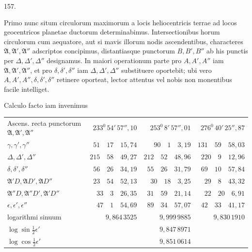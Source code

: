 \par{}\medskip
{}\hypertarget{native-213-article157}{}
\begin{center}157.\end{center}
Primo nunc situm circulorum maximorum a locis heliocentricis terrae ad locos geocentricos planetae ductorum determinabimus. Intersectionibus horum circulorum cum aequatore, aut si mavis illorum nodis ascendentibus, characteres $\mathfrak A,\mathfrak A',\mathfrak A''$ adscriptos concipimus, distantiasque punctorum $B,B',B''$ ab his punctis per $\Delta,\Delta',\Delta''$ designamus. In maiori operationum parte pro $A,A',A''$ iam $\mathfrak A,\mathfrak A',\mathfrak A''$, et pro $\delta,\delta',\delta''$ iam $\Delta,\Delta',\Delta''$ substituere oportebit; ubi vero $A,A',A'',\delta,\delta',\delta''$ retinere oporteat, lector attentus vel nobis non monentibus facile intelliget.

Calculo facto iam invenimus
\begin{center}
\begingroup\footnotesize\setlength{\tabcolsep}{3pt}\renewcommand{\arraystretch}{1.25}
\begin{tabular}{l|r|r|r}
\shortstack{Ascens. recta punctorum\\$\mathfrak A,\mathfrak A',\mathfrak A''$} & $233^0\,54'\,57''{,}10$ & $253^0\,8'\,57''{,}01$ & $276^0\,40'\,25''{,}87$\\
$\gamma,\gamma',\gamma''$ & $51\quad17\quad15{,}74$ & $90\quad1\quad3{,}19$ & $131\quad59\quad58{,}03$\\
$\Delta,\Delta',\Delta''$ & $215\quad58\quad49{,}27$ & $212\quad52\quad48{,}96$ & $220\quad9\quad12{,}96$\\
$\delta,\delta',\delta''$ & $56\quad26\quad34{,}19$ & $55\quad26\quad31{,}79$ & $69\quad10\quad57{,}84$\\
$\mathfrak A'D,\mathfrak AD',\mathfrak AD''$ & $23\quad54\quad52{,}13$ & $30\quad18\quad3{,}25$ & $29\quad8\quad43{,}32$\\
$\mathfrak A''D,\mathfrak A''D',\mathfrak A'D''$ & $33\quad3\quad26{,}35$ & $31\quad59\quad21{,}14$ & $22\quad20\quad6{,}91$\\
$\epsilon,\epsilon',\epsilon''$ & $47\quad1\quad54{,}69$ & $89\quad34\quad57{,}07$ & $42\quad33\quad41{,}17$\\
logarithmi sinuum & $9{,}864\,3525$ & $9{,}999\,9885$ & $9{,}830\,1910$\\
$\log\sin\tfrac12\epsilon'$ & & $9{,}847\,8971$ &\\
$\log\cos\tfrac12\epsilon'$ & & $9{,}851\,0614$ &
\end{tabular}\endgroup
\end{center}

